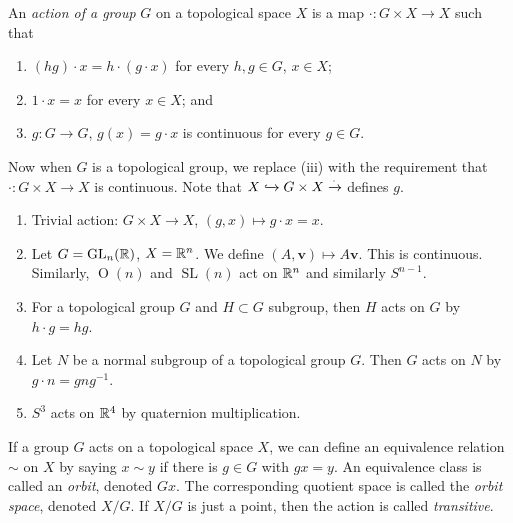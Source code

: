 
\begin{definition}
	An \emph{action of a group} $G$ on a topological space $X$ is a
	map $\cdot : G \times X \to X$ such that
	\begin{enumerate}
		\item $(hg) \cdot x = h \cdot (g \cdot x)$
			for every $h,g \in G$, $x \in X$;
		\item $1 \cdot x = x$ for every $x \in X$; and
		\item $g: G \to G$, $g(x) = g \cdot x$ is continuous
			for every $g \in G$.
	\end{enumerate}
\end{definition}

Now when $G$ is a topological group, we replace (iii) with the 
requirement that $\cdot: G \times X \to X$ is continuous.
Note that $X \xhookrightarrow{} G \times X \xrightarrow{\cdot}$ defines
$g$.

\begin{examples}
	\begin{enumerate}
		\item Trivial action:
		$G \times X \to X$, $(g,x) \mapsto g \cdot x = x$.

		\item Let $G = \operatorname{GL}_n(\mathbb{R})$, $X = \mathbb{R}^n$.
		We define $(A, \bm v) \mapsto A \bm v$.
		This is continuous.
		Similarly, $\operatorname{O}(n)$ and $\operatorname{SL}(n)$
		act on $\mathbb{R}^n$ and similarly $S^{n-1}$.

		\item For a topological group $G$
		and $H \subset G$ subgroup, 
		then $H$ acts on $G$ by $h \cdot g = hg$.

		\item Let $N$ be a normal subgroup of a topological group
		$G$. Then $G$ acts on $N$ by
		$g \cdot n = gng^{-1}$.

		\item $S^3$ acts on $\mathbb{R}^4$ by quaternion multiplication.
	\end{enumerate}
\end{examples}

\begin{definition}[Orbit]
	If a group $G$ acts on a topological space $X$,
	we can define an equivalence relation $\sim$ on $X$ by saying
	$x \sim y$ if there is $g \in G$ with $gx = y$.
	An equivalence class is called an \emph{orbit}, denoted
	$Gx$.
	The corresponding quotient space is called the \emph{orbit space},
	denoted $X/G$.
	If $X/G$ is just a point, then the action is called \emph{transitive}.
\end{definition}

